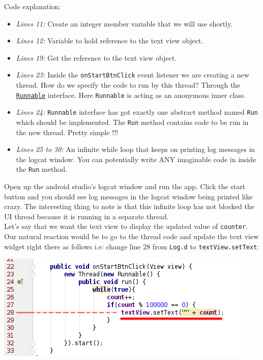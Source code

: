 Code explanation:
\begin{itemize}
	\item \textit{Lines 11:} Create an integer member variable that we will use shortly.
	
	\item \textit{Lines 12:} Variable to hold reference to the text view object.
	
	\item \textit{Lines 19:} Get the reference to the text view object.
	
	\item \textit{Lines 23:} Inside the \texttt{onStartBtnClick} event listener we are creating a new thread. How do we specify the code to run by this thread? Through the \href{https://developer.android.com/reference/java/lang/Runnable.html}{\texttt{Runnable}} interface. Here \texttt{Runnable} is acting as an anonymous inner class.
	
	\item \textit{Lines 24:} \texttt{Runnable} interface has got exactly one abstract method named \texttt{Run} which should be implemented. The \texttt{Run} method contains code to be run in the new thread. Pretty simple !!!
	
	\item \textit{Lines 25 to 30:} An infinite while loop that keeps on printing log messages in the logcat window. You can potentially write ANY imaginable code in inside the \texttt{Run} method.
	
\end{itemize}

Open up the android studio's logcat window and run the app. Click the start button and you should see log messages in the logcat window being printed like crazy. The interesting thing to note is that this infinite loop has not blocked the UI thread because it is running in a separate thread. \\

Let's say that we want the text view to display the updated value of \texttt{counter}. Our natural reaction would be to go to the thread code and update the text view widget right there as follows i.e: change line 28 from \texttt{Log.d} to \texttt{textView.setText}:

\begin{center}
	\includegraphics[scale=\SourceCodeScale]{chapters/ch14/images/20}
\end{center}


